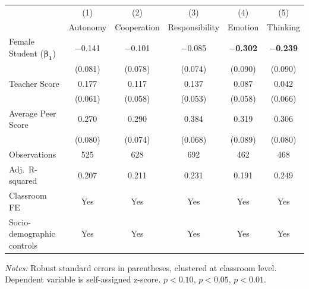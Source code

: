 \begin{threeparttable}
\begin{tabular}{l*{5}{c}}
\toprule
 & (1) & (2) & (3) & (4) & (5) \\
 & Autonomy & Cooperation & Responsibility & Emotion & Thinking \\
\midrule
\rowcolor{HopBlue!8}
{Female Student ($\bm{\beta_1}$)} & $-$0.141\sym{*} & $-$0.101 & $-$0.085 & $-$\textbf{0.302}\sym{***} & $-$\textbf{0.239}\sym{***} \\
\rowcolor{HopBlue!8}
 & (0.081) & (0.078) & (0.074) & (0.090) & (0.090) \\[3pt]
Teacher Score & 0.177\sym{***} & 0.117\sym{**} & 0.137\sym{***} & 0.087 & 0.042 \\
 & (0.061) & (0.058) & (0.053) & (0.058) & (0.066) \\[3pt]
Average Peer Score & 0.270\sym{***} & 0.290\sym{***} & 0.384\sym{***} & 0.319\sym{***} & 0.306\sym{***} \\
 & (0.080) & (0.074) & (0.068) & (0.089) & (0.080) \\
\midrule
Observations & 525 & 628 & 692 & 462 & 468 \\
Adj.\ R-squared & 0.207 & 0.211 & 0.231 & 0.191 & 0.249 \\
Classroom FE & Yes & Yes & Yes & Yes & Yes \\
Socio-demographic controls & Yes & Yes & Yes & Yes & Yes \\
\bottomrule
\end{tabular}
\begin{tablenotes}[flushleft]
\scriptsize
\item \textit{Notes:} Robust standard errors in parentheses, clustered at classroom level. Dependent variable is self-assigned z-score. \sym{*}$p<0.10$, \sym{**}$p<0.05$, \sym{***}$p<0.01$.
\end{tablenotes}
\end{threeparttable}
